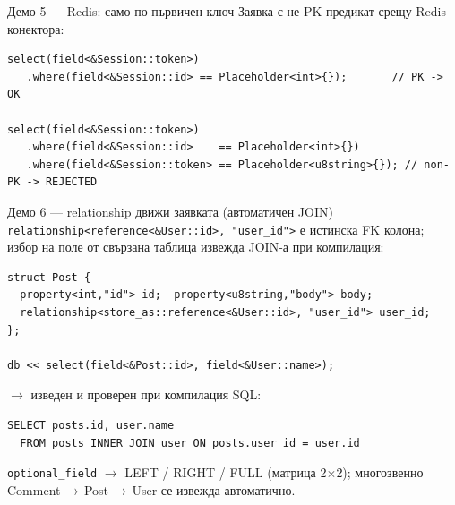 \documentclass[aspectratio=169,12pt]{beamer}
\begin{document}
\begin{frame}[fragile]{Демо 5 — Redis: само по първичен ключ}
    {\footnotesize Заявка с не-PK предикат срещу Redis конектора:}
\begin{lstlisting}[basicstyle=\footnotesize\ttfamily]
select(field<&Session::token>)
   .where(field<&Session::id> == Placeholder<int>{});       // PK -> OK

select(field<&Session::token>)
   .where(field<&Session::id>    == Placeholder<int>{})
   .where(field<&Session::token> == Placeholder<u8string>{}); // non-PK -> REJECTED
\end{lstlisting}
    
\end{frame}

\begin{frame}[fragile]{Демо 6 — relationship движи заявката (автоматичен JOIN)}
    {\footnotesize \texttt{relationship<reference<\&User::id>, "user\_id">} е истинска
    FK колона; избор на поле от свързана таблица извежда JOIN-а при компилация:}
\begin{lstlisting}[basicstyle=\footnotesize\ttfamily]
struct Post {
  property<int,"id"> id;  property<u8string,"body"> body;
  relationship<store_as::reference<&User::id>, "user_id"> user_id;
};

db << select(field<&Post::id>, field<&User::name>);
\end{lstlisting}
    {\scriptsize $\rightarrow$ изведен и проверен при компилация SQL:}
\begin{lstlisting}[basicstyle=\scriptsize\ttfamily,keywordstyle=\color{black}]
SELECT posts.id, user.name
  FROM posts INNER JOIN user ON posts.user_id = user.id
\end{lstlisting}
    {\scriptsize \texttt{optional\_field} $\rightarrow$ LEFT / RIGHT / FULL (матрица 2$\times$2);
    многозвенно Comment\,$\rightarrow$\,Post\,$\rightarrow$\,User се извежда автоматично.}
\end{frame}
\end{document}
